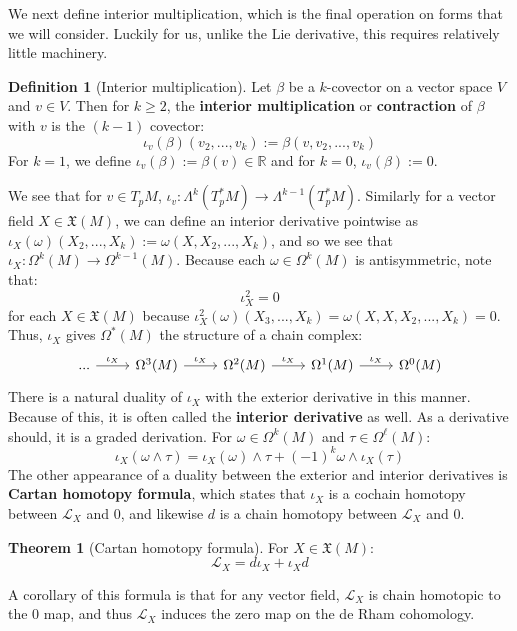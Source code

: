 \documentclass[11pt, oneside]{article}   	%
\theoremstyle{definition}
\newtheorem{definition}{Definition}[section]
\newtheorem{theorem}{Theorem}[section]
\begin{document}
We next define interior multiplication, which is the final operation on forms that we will consider. Luckily for us, unlike the 
Lie derivative, this requires relatively little machinery.
\begin{definition}[Interior multiplication]
	Let $\beta$ be a $k$-covector on a vector space $V$ and $v\in V$. Then for $k\geq 2$, the \textbf{interior multiplication} 
	or \textbf{contraction} of $\beta$ with $v$ is the $(k-1)$ covector:
	\begin{equation}
		\iota_v(\beta)(v_2, ..., v_k) := \beta(v, v_2, ..., v_k)
	\end{equation}
	For $k = 1$, we define $\iota_v(\beta) := \beta(v)\in\mathbb R$ and for $k = 0$, $\iota_v(\beta) := 0$. 
\end{definition}

We see that for $v\in T_p M$, $\iota_v : \Lambda^k(T_p^* M)\rightarrow\Lambda^{k - 1}(T_p^* M)$. Similarly for a 
vector field $X\in\mathfrak X(M)$, we can define an interior derivative pointwise as $\iota_X(\omega)(X_2, ..., X_k) := 
\omega(X, X_2, ..., X_k)$, and so we see that $\iota_X : \Omega^k(M)\rightarrow\Omega^{k - 1}(M)$. Because each 
$\omega\in\Omega^k(M)$ is antisymmetric, note that:
\begin{equation}
	\iota_X^2 = 0
\end{equation}
for each $X\in\mathfrak X(M)$ because $\iota_X^2(\omega)(X_3, ..., X_k) = \omega(X, X, X_2, ..., X_k) = 0$. Thus, 
$\iota_X$ gives $\Omega^*(M)$ the structure of a chain complex:
\begin{equation}\begin{tikzcd}
	...\arrow[r, "\iota_X"] & \Omega^3(M) \arrow[r, "\iota_X"] & \Omega^2(M) \arrow[r, "\iota_X"] & \Omega^1(M) \arrow[r, 
	"\iota_X"] & \Omega^0(M)
\end{tikzcd}\end{equation}
There is a natural duality of $\iota_X$ with the exterior derivative in this manner. Because of this, it is often called the 
\textbf{interior derivative} as well. As a derivative should, it is a graded derivation. For $\omega\in\Omega^k(M)$ and 
$\tau\in\Omega^\ell(M)$:
\begin{equation}
	\iota_X(\omega\wedge\tau) = \iota_X(\omega)\wedge\tau + (-1)^k\omega\wedge\iota_X(\tau)
\end{equation}
The other appearance of a duality between the exterior and interior derivatives is \textbf{Cartan homotopy formula}, which 
states that $\iota_X$ is a cochain homotopy between $\mathcal L_X$ and 0, and likewise $d$ is a chain homotopy between 
$\mathcal L_X$ and 0. 
\begin{theorem}[Cartan homotopy formula]
	For $X\in\mathfrak X(M)$:
	\begin{equation}
		\mathcal L_X = d\iota_X + \iota_X d
	\end{equation}
\end{theorem}
A corollary of this formula is that for any vector field, $\mathcal L_X$ is chain homotopic to the 0 map, and thus $\mathcal 
L_X$ induces the zero map on the de Rham cohomology. 
\end{document}
